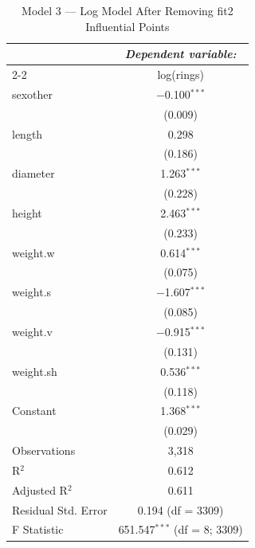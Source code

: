 \documentclass[12pt]{article}
\begin{document}
	\begin{table}[!htbp]
		\centering
		\caption{Model 3 — Log Model After Removing fit2 Influential Points}
		\label{tab:fit3}
		\begin{tabular}{@{\extracolsep{5pt}}lc}
			\toprule
			& \multicolumn{1}{c}{\textit{Dependent variable:}} \\
			\cmidrule(lr){2-2}
			& log(rings) \\
			\midrule
			sexother   & $-$0.100$^{***}$ \\ 
			& (0.009) \\[0.4ex]
			length     & 0.298 \\ 
			& (0.186) \\[0.4ex]
			diameter   & 1.263$^{***}$ \\ 
			& (0.228) \\[0.4ex]
			height     & 2.463$^{***}$ \\ 
			& (0.233) \\[0.4ex]
			weight.w   & 0.614$^{***}$ \\ 
			& (0.075) \\[0.4ex]
			weight.s   & $-$1.607$^{***}$ \\ 
			& (0.085) \\[0.4ex]
			weight.v   & $-$0.915$^{***}$ \\ 
			& (0.131) \\[0.4ex]
			weight.sh  & 0.536$^{***}$ \\ 
			& (0.118) \\[0.4ex]
			Constant   & 1.368$^{***}$ \\ 
			& (0.029) \\[0.4ex]
			\midrule
			Observations        & 3,318 \\ 
			R$^{2}$             & 0.612 \\ 
			Adjusted R$^{2}$    & 0.611 \\ 
			Residual Std. Error & 0.194 (df = 3309) \\ 
			F Statistic         & 651.547$^{***}$ (df = 8; 3309) \\ 
			\bottomrule
		\end{tabular}
	\end{table}
	
\end{document}
